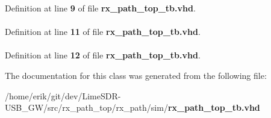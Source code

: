 Definition at line {\bf 9} of file {\bf rx\+\_\+path\+\_\+top\+\_\+tb.\+vhd}.

\paragraph[{S\+T\+D\+\_\+\+L\+O\+G\+I\+C\+\_\+\+T\+E\+X\+T\+IO}]{\hspace{0.3cm}{\ttfamily [Package]}}\label{classrx__path__top__tb_a9a20322ff9f4f65f8efd825c83bfd99d}


Definition at line {\bf 11} of file {\bf rx\+\_\+path\+\_\+top\+\_\+tb.\+vhd}.

\paragraph[{textio}]{\hspace{0.3cm}{\ttfamily [Package]}}\label{classrx__path__top__tb_aa8c4e25998323a84db5b1fa701b92fcb}


Definition at line {\bf 12} of file {\bf rx\+\_\+path\+\_\+top\+\_\+tb.\+vhd}.



The documentation for this class was generated from the following file\+:\begin{DoxyCompactItemize}
\item 
/home/erik/git/dev/\+Lime\+S\+D\+R-\/\+U\+S\+B\+\_\+\+G\+W/src/rx\+\_\+path\+\_\+top/rx\+\_\+path/sim/{\bf rx\+\_\+path\+\_\+top\+\_\+tb.\+vhd}\end{DoxyCompactItemize}
